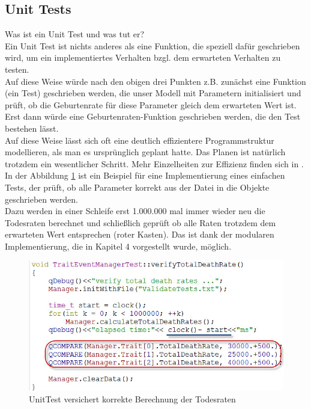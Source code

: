 \documentclass[11pt, a4paper, german]{article}
\theoremstyle{plain}
\begin{document}
	\subsection{Unit Tests}
	Was ist ein Unit Test und was tut er?\\
	Ein Unit Test ist nichts anderes als eine Funktion, die speziell dafür geschrieben wird, um ein implementiertes Verhalten bzgl. dem erwarteten Verhalten zu testen.\\
	Auf diese Weise würde nach den obigen drei Punkten z.B. zunächst eine Funktion (ein Test) geschrieben werden, die unser Modell mit Parametern initialisiert und prüft, ob die Geburtenrate für diese Parameter gleich dem erwarteten Wert ist. Erst dann würde eine Geburtenraten-Funktion geschrieben werden, die den Test bestehen lässt.\\ 
	Auf diese Weise lässt sich oft eine deutlich effizientere Programmstruktur modellieren, als man es ursprünglich geplant hatte. Das Planen ist natürlich trotzdem ein wesentlicher Schritt. Mehr Einzelheiten zur Effizienz finden sich in \cite[The Bowling Game: An example of test-first pair programming]{martin2008clean}.\\
	In der Abbildung \ref{Unit Test} ist ein Beispiel für eine Implementierung eines einfachen Tests, der prüft, ob alle Parameter korrekt aus der Datei in die Objekte geschrieben werden.\\
	Dazu werden in einer Schleife erst 1.000.000 mal immer wieder neu die Todesraten berechnet und schließlich geprüft ob alle Raten trotzdem dem erwarteten Wert entsprechen (roter Kasten). Das ist dank der modularen Implementierung, die in Kapitel 4 vorgestellt wurde, möglich.
	\begin{figure}[H]
		\centering
		\includegraphics[width=1 \linewidth]{./Pictures/UnitTest_death}
		\caption[UnitTest]{UnitTest versichert korrekte Berechnung der Todesraten}
		\label{Unit Test}
	\end{figure}
\end{document}
